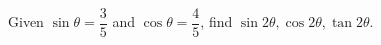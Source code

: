 Given $\sin\theta=\dfrac{3}{5}$ and $\cos\theta=\dfrac{4}{5}$, find $\sin2\theta,\cos2\theta,\tan2\theta$.

